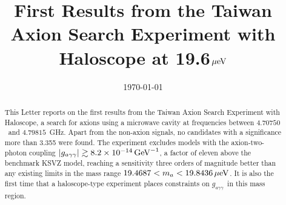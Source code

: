 \documentclass[%
 reprint,prl, %
superscriptaddress,
nobibnotes,
 amsmath,amssymb,
 aps,
]{revtex4-2}
\newcommand{\gagg}{\ensuremath{\left|g_{a\gamma\gamma}\right|}}
\newcommand{\bgagg}{\ensuremath{g_{a\gamma\gamma}}}
\newcommand{\ma}{\ensuremath{m_a}}
\newcommand{\muevcc}{\ensuremath{\,\mu\text{e\hspace{-.08em}V}}}
\newcommand{\GeVinv}{\ensuremath{\,\text{Ge\hspace{-.08em}V}^{-1}}}
\newcommand{\flo}{\ensuremath{4.70750}}
\newcommand{\fhi}{\ensuremath{4.79815}}
\newcommand{\mlo}{\ensuremath{19.4687}}
\newcommand{\mhi}{\ensuremath{19.8436}}
\newcommand{\avelimit}{\ensuremath{8.2\times 10^{-14}}} %
\begin{document}

\title{First Results from the Taiwan Axion Search Experiment with Haloscope at 19.6\muevcc}%



\date{\today}%

\begin{abstract}

 This Letter reports on the first results from the 
Taiwan Axion Search Experiment with Haloscope, a search for axions 
using a microwave cavity at frequencies between \flo\ and \fhi~GHz. 
Apart from the non-axion signals, no candidates with 
a significance more than 3.355 were found. The experiment excludes 
models with the axion-two-photon coupling $\gagg\gtrsim \avelimit\GeVinv$, 
a factor of eleven above the benchmark 
KSVZ model, reaching 
a sensitivity three orders of magnitude better than any existing limits 
 in the mass range $\mlo < \ma < \mhi \muevcc$.  
 It is also the first time that a haloscope-type experiment places 
constraints on \bgagg\ in this mass region.


\end{abstract}

\maketitle
\end{document}
